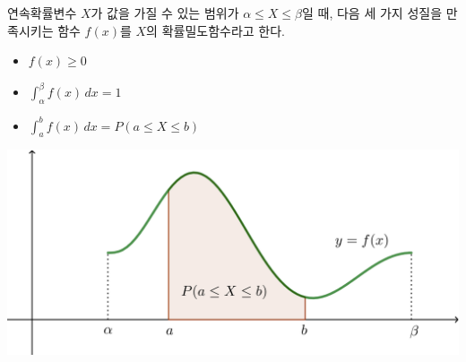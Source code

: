 \documentclass[t,8pt]{beamer}
\begin{document}
\begin{frame}[t]{\subsecname}
연속확률변수 \(X\)가 값을 가질 수 있는 범위가 \(\alpha\le X\le \beta\)일 때, 다음 세 가지 성질을 만족시키는 함수 \(f(x)\)를 \(X\)의 \alert{확률밀도함수}라고 한다.\par\bigskip
\begin{minipage}{.48\textwidth}
\begin{itemize}
\setlength{\itemsep}{15pt}
\item
\(f(x)\ge0\)
\item
\(\displaystyle\int_\alpha^\beta f(x)\,dx=1\)
\item
\(\displaystyle\int_a^b f(x)\,dx=P(a\le X\le b)\)
\end{itemize}
\par\bigskip
\begin{center}
\includegraphics[width=.8\textwidth]{img/2-3-1}
\end{center}
\end{minipage}
\pause
\begin{minipage}{.46\textwidth}
\end{minipage}
\end{frame}
\end{document}
